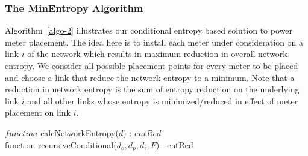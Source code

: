 \subsubsection{The MinEntropy Algorithm}
Algorithm~\ref{algo-2} illustrates our conditional entropy based solution to power meter placement. The idea here is to install each meter under consideration on a link $i$ of the network which results in maximum reduction in overall network entropy. We consider all possible placement points for every meter to be placed and choose a link that reduce the network entropy to a minimum. Note that a reduction in network entropy is the sum of entropy reduction on the underlying link $i$ and all other links whose entropy is minimized/reduced in effect of meter placement on link $i$.

\begin{algorithm}[!htp]
\begin{small}
\BlankLine %
$function$ calcNetworkEntropy($d$) : $entRed$\\
\BlankLine %
function recursiveConditional($d_o,d_p,d_i,F$) : entRed\\
\end{small}
\end{algorithm}
